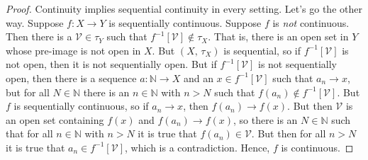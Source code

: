 \documentclass{article}
\theoremstyle{plain}
\theoremstyle{normal}
\begin{document}
        \begin{proof}
            Continuity implies sequential continuity in every setting.
            Let's go the other way. Suppose $f:X\rightarrow{Y}$ is
            sequentially continuous. Suppose $f$ is \textit{not} continuous.
            Then there is a $\mathcal{V}\in\tau_{Y}$ such that
            $f^{-1}[\mathcal{V}]\notin\tau_{X}$. That is, there is an open
            set in $Y$ whose pre-image is not open in $X$. But
            $(X,\,\tau_{X})$ is sequential, so if $f^{-1}[\mathcal{V}]$ is not
            open, then it is not sequentially open. But if
            $f^{-1}[\mathcal{V}]$ is not sequentially open, then
            there is a sequence $a:\mathbb{N}\rightarrow{X}$ and an
            $x\in{f}^{-1}[\mathcal{V}]$ such that
            $a_{n}\rightarrow{x}$, but for all $N\in\mathbb{N}$ there is an
            $n\in\mathbb{N}$ with $n>N$ such that
            $f(a_{n})\notin{f}^{-1}[\mathcal{V}]$. But $f$ is sequentially
            continuous, so if $a_{n}\rightarrow{x}$, then
            $f(a_{n})\rightarrow{f}(x)$. But then $\mathcal{V}$ is an open set
            containing $f(x)$ and $f(a_{n})\rightarrow{f}(x)$, so there is an
            $N\in\mathbb{N}$ such that for all $n\in\mathbb{N}$ with $n>N$
            it is true that $f(a_{n})\in\mathcal{V}$. But then for all
            $n>N$ it is true that $a_{n}\in{f}^{-1}[\mathcal{V}]$, which is
            a contradiction. Hence, $f$ is continuous.
        \end{proof}
\end{document}
